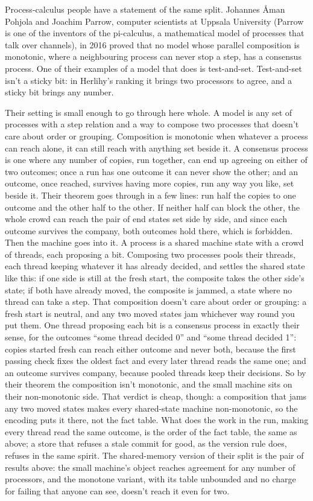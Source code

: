 \documentclass[11pt,twoside]{article}
\theoremstyle{thielethm}
\theoremstyle{thieledef}
\theoremstyle{thieledef}
\theoremstyle{thieledef}
\theoremstyle{thielethm}
\theoremstyle{thieleobs}
\theoremstyle{thielethm}
\begin{document}
Process-calculus people have a statement of the same split. Johannes \AA{}man Pohjola and
Joachim Parrow, computer scientists at Uppsala University (Parrow is one of the inventors of the
pi-calculus, a mathematical model of processes that talk over channels), in 2016 proved that no model whose parallel composition is
monotonic, where a neighbouring process can never stop a step, has a consensus process. One of
their examples of a model that does is test-and-set. Test-and-set isn't a sticky bit: in Herlihy's
ranking it brings two processors to agree, and a sticky bit brings any number.

Their setting is small enough to go through here whole. A model is any set of processes with a step
relation and a way to compose two processes that doesn't care about order or grouping. Composition
is monotonic when whatever a process can reach alone, it can still reach with anything set beside
it. A consensus process is one where any number of copies, run together, can end up agreeing on
either of two outcomes; once a run has one outcome it can never show the other; and an outcome,
once reached, survives having more copies, run any way you like, set beside it. Their theorem
goes through in a few lines: run half the copies to one outcome and the other half to the other.
If neither half can block the other, the whole crowd can reach the pair of end states set side by
side, and since each outcome survives the company, both outcomes hold there, which is forbidden.
Then the machine goes into it. A process is a shared machine state with a crowd of threads, each
proposing a bit. Composing two processes pools their threads, each thread keeping whatever it has
already decided, and settles the shared state like this: if one side is still at the fresh start,
the composite takes the other side's state; if both have already moved, the composite is jammed, a
state where no thread can take a step. That composition doesn't care about order or grouping: a
fresh start is neutral, and any two moved states jam whichever way round you put them. One thread
proposing each bit is a consensus process in exactly their sense, for the outcomes ``some thread
decided 0'' and ``some thread decided 1'': copies started fresh can reach either outcome and never
both, because the first passing check fixes the oldest fact and every later thread reads the same
one; and an outcome survives company, because pooled threads keep their decisions. So by their
theorem the composition isn't monotonic, and the small machine sits on their non-monotonic side.
That verdict is cheap, though: a composition that jams any two moved states makes every shared-state
machine non-monotonic, so the encoding puts it there, not the fact table. What does the work in the
run, making every thread read the same outcome, is the order of the fact table, the same as above; a store that
refuses a stale commit for good, as the version rule does, refuses in the same spirit. The
shared-memory version of their split is the pair of results above: the small
machine's object reaches agreement for any number of processors, and the monotone variant, with
its table unbounded and no charge for failing that anyone can see, doesn't reach it even for two.
\end{document}
